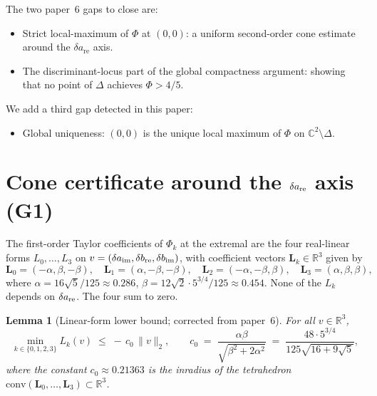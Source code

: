 \documentclass[11pt,a4paper]{article}
\newtheorem{lemma}[theorem]{Lemma}
\begin{document}
The two paper~6 gaps to close are:
\begin{itemize}
\item[\textbf{G1.}] Strict local-maximum of $\Phi$ at $(0,0)$: a
  uniform second-order cone estimate around the
  $\delta a_{\mathrm{re}}$ axis.
\item[\textbf{G2.}] The discriminant-locus part of the global
  compactness argument: showing that no point of $\Delta$ achieves
  $\Phi > 4/5$.
\end{itemize}
We add a third gap detected in this paper:
\begin{itemize}
\item[\textbf{G3.}] Global uniqueness: $(0,0)$ is the unique local
  maximum of $\Phi$ on $\mathbb{C}^2\setminus\Delta$.
\end{itemize}

\section{Cone certificate around the $\delta a_{\rm re}$ axis (G1)}
\label{sec:G1}

The first-order Taylor coefficients of $\Phi_k$ at the extremal are the
four real-linear forms $L_0,\dots,L_3$ on $v=(\delta a_{\rm im},
\delta b_{\rm re},\delta b_{\rm im})$, with coefficient vectors
$\mathbf L_k\in\mathbb{R}^3$ given by
\begin{equation}
\mathbf L_0 = (-\alpha,\beta,-\beta), \quad
\mathbf L_1 = (\alpha,-\beta,-\beta), \quad
\mathbf L_2 = (-\alpha,-\beta,\beta), \quad
\mathbf L_3 = (\alpha,\beta,\beta),
\end{equation}
where
$\alpha = 16\sqrt 5/125\approx 0.286$,
$\beta = 12\sqrt 2\cdot 5^{3/4}/125\approx 0.454$.
None of the $L_k$ depends on $\delta a_{\rm re}$. The four sum to zero.

\begin{lemma}[Linear-form lower bound; corrected from paper~6]
\label{lem:c0}
For all $v\in\mathbb{R}^3$,
\begin{equation}
\min_{k\in\{0,1,2,3\}} L_k(v) \;\le\; -\,c_0\,\|v\|_2,
\qquad
c_0 \;=\; \frac{\alpha\beta}{\sqrt{\beta^2 + 2\alpha^2}} \;=\; \frac{48\cdot 5^{3/4}}{125\sqrt{16+9\sqrt 5}},
\end{equation}
where the constant $c_0\approx 0.21363$ is the inradius of the
tetrahedron $\mathrm{conv}(\mathbf L_0,\dots,\mathbf L_3)\subset
\mathbb{R}^3$.
\end{lemma}
\end{document}
